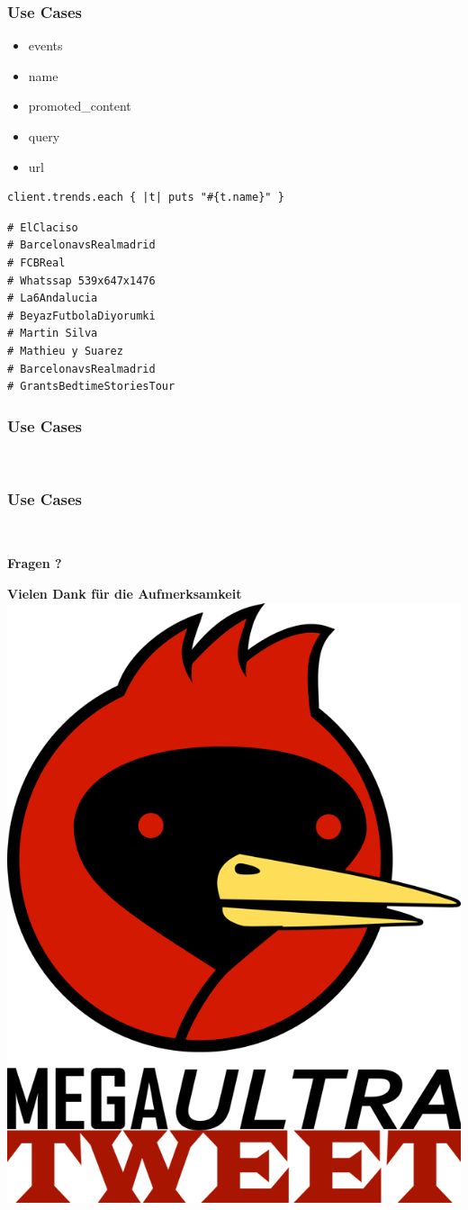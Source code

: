\documentclass{beamer}
\begin{document}
\begin{frame}[fragile]
  \frametitle{Use Cases}
  \begin{itemize}
    \item events
    \item name
    \item promoted\_content
    \item query
    \item url
  \end{itemize}\pause
  \begin{lstlisting}
client.trends.each { |t| puts "#{t.name}" }   
  \end{lstlisting}\pause
  \begin{lstlisting}
# ElClaciso
# BarcelonavsRealmadrid
# FCBReal
# Whatssap 539x647x1476
# La6Andalucia
# BeyazFutbolaDiyorumki
# Martin Silva
# Mathieu y Suarez
# BarcelonavsRealmadrid
# GrantsBedtimeStoriesTour
  \end{lstlisting}
\end{frame}

\begin{frame}[fragile]
  \frametitle{Use Cases}
  \begin{lstlisting}
    
  \end{lstlisting}
\end{frame}

\begin{frame}[fragile]
  \frametitle{Use Cases}
  \begin{lstlisting}
    
  \end{lstlisting}
\end{frame}



% 
% 


\begin{frame}
  \begin{center}
      \textbf{Fragen ?}
  \end{center}
\end{frame}

\begin{frame}
  \begin{center}
      \textbf{Vielen Dank für die Aufmerksamkeit} \\
      \includegraphics[width=.4\textwidth]{megaultra_ruby}
  \end{center}
\end{frame}
\end{document}

